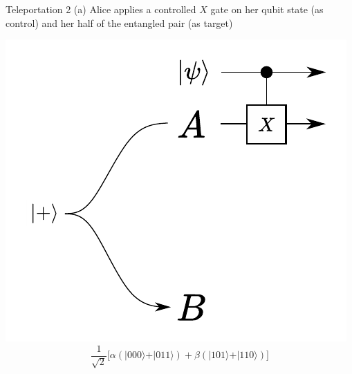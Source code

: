 \documentclass[11pt]{beamer}
\begin{document}
\begin{frame}{Teleportation 2 (a)}
Alice applies a controlled $X$ gate on her qubit state (as control) and her half of the entangled pair (as target)

\vspace{0.5cm}

\begin{center}
\includegraphics[scale=0.6]{tele2.pdf}
$$
\frac{1}{\sqrt{2}}\big[ \alpha(\vert 000\rangle+\vert 011\rangle) + \beta (\vert 101\rangle + \vert 110\rangle) \big]
$$
\end{center}
\end{frame}
\end{document}
